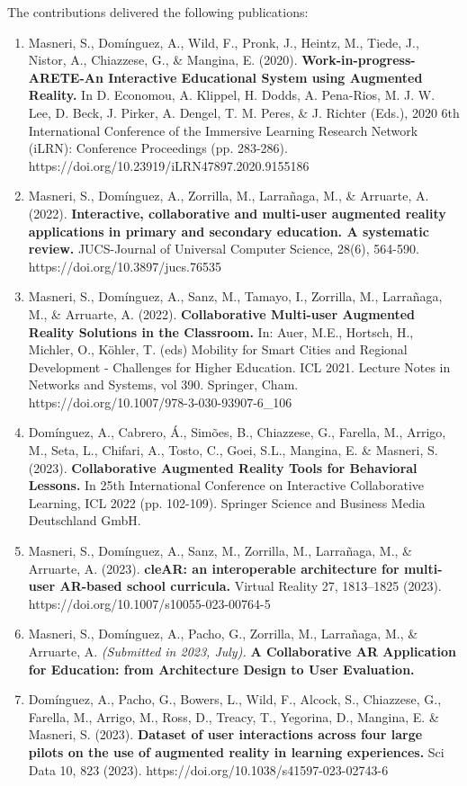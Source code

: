 The contributions delivered the following publications:
\begin{enumerate}[start=1,,ref=P\arabic*,label={\bfseries P\arabic*:}]
    \item Masneri, S., Domínguez, A., Wild, F., Pronk, J., Heintz, M., Tiede, J., Nistor, A., Chiazzese, G., \& Mangina, E. (2020). \textbf{Work-in-progress-ARETE-An Interactive Educational System using Augmented Reality.} In D. Economou, A. Klippel, H. Dodds, A. Pena-Rios, M. J. W. Lee, D. Beck, J. Pirker, A. Dengel, T. M. Peres, \& J. Richter (Eds.), 2020 6th International Conference of the Immersive Learning Research Network (iLRN): Conference Proceedings (pp. 283-286). https://doi.org/10.23919/iLRN47897.2020.9155186 \label{pub:intro}
    \item Masneri, S., Domínguez, A., Zorrilla, M., Larrañaga, M., \& Arruarte, A. (2022). \textbf{Interactive, collaborative and multi-user augmented reality applications in primary and secondary education. A systematic review.} JUCS-Journal of Universal Computer Science, 28(6), 564-590. https://doi.org/10.3897/jucs.76535 \label{pub:sota}
    \item Masneri, S., Domínguez, A., Sanz, M., Tamayo, I., Zorrilla, M., Larrañaga, M., \& Arruarte, A. (2022). \textbf{Collaborative Multi-user Augmented Reality Solutions in the Classroom.} In: Auer, M.E., Hortsch, H., Michler, O., Köhler, T. (eds) Mobility for Smart Cities and Regional Development - Challenges for Higher Education. ICL 2021. Lecture Notes in Networks and Systems, vol 390. Springer, Cham. https://doi.org/10.1007/978-3-030-93907-6\_106 \label{pub:ork}
    \item Domínguez, A., Cabrero, Á., Simões, B., Chiazzese, G., Farella, M., Arrigo, M., Seta, L., Chifari, A., Tosto, C., Goei, S.L., Mangina, E. \& Masneri, S. (2023). \textbf{Collaborative Augmented Reality Tools for Behavioral Lessons.} In 25th International Conference on Interactive Collaborative Learning, ICL 2022 (pp. 102-109). Springer Science and Business Media Deutschland GmbH. \label{pub:beh}
    \item Masneri, S., Domínguez, A., Sanz, M., Zorrilla, M., Larrañaga, M., \& Arruarte, A. (2023). \textbf{cleAR: an interoperable architecture for multi-user AR-based school curricula.}  Virtual Reality 27, 1813–1825 (2023). https://doi.org/10.1007/s10055-023-00764-5 \label{pub:arch}
    \item Masneri, S., Domínguez, A., Pacho, G., Zorrilla, M., Larrañaga, M., \& Arruarte, A. \textit{(Submitted in 2023, July).} \textbf{A Collaborative AR Application for Education: from Architecture Design to User Evaluation.} \label{pub:eval}
    \item Domínguez, A., Pacho, G., Bowers, L., Wild, F., Alcock, S., Chiazzese, G., Farella, M., Arrigo, M., Ross, D., Treacy, T., Yegorina, D., Mangina, E. \& Masneri, S. (2023). \textbf{Dataset of user interactions across four large pilots on the use of augmented reality in learning experiences.} Sci Data 10, 823 (2023). https://doi.org/10.1038/s41597-023-02743-6 \label{pub:eval2}
\end{enumerate}


